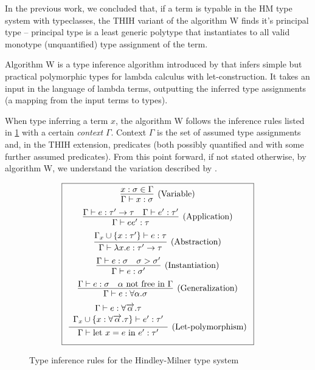 In the previous work, we concluded that, if a term is typable in the HM type system with typeclasses, the THIH variant of the algorithm W finds it's principal type -- principal type is a least generic polytype that instantiates to all valid monotype (unquantified) type assignment of the term.

Algorithm W is a type inference algorithm introduced by \citet{damas1982principal} that infers simple but practical polymorphic types for lambda calculus with let-construction. It takes an input in the language of lambda terms, outputting the inferred type assignments (a mapping from the input terms to types).

When type inferring a term $x$, the algorithm W follows the inference rules listed in \cref{fig:wRules} with a certain \emph{context} $\Gamma$. Context $\Gamma$ is the set of assumed type assignments and, in the THIH extension, predicates (both possibly quantified and with some further assumed predicates). From this point forward, if not stated otherwise, by algorithm W, we understand the variation described by \citet{jones1999typing}.

\begin{figure}
    \caption{Type inference rules for the Hindley-Milner type system}
    \label{fig:wRules}
    $$\boxed{\renewcommand{\arraystretch}{2.2}\begin{array}{cc}
        \infer[\text{(Variable)}]{\Gamma \vdash x : \sigma}{x : \sigma \in \Gamma} \\
        \infer[\text{(Application)}]{\Gamma \vdash e e' : \tau}{\Gamma \vdash e : \tau' \rightarrow \tau & \Gamma \vdash e' : \tau'} \\
        \infer[\text{(Abstraction)}]{\Gamma \vdash \lambda x . e : \tau' \rightarrow \tau}{\Gamma_x \cup \{x : \tau'\} \vdash e : \tau} \\
        \infer[\text{(Instantiation)}]{\Gamma \vdash e : \sigma'}{\Gamma \vdash e : \sigma & \sigma > \sigma'}\\
        \infer[\text{(Generalization)}]{\Gamma \vdash e : \forall \alpha . \sigma}{\Gamma \vdash e : \sigma & \alpha \text{ not free in }\Gamma}\\
        \infer[\text{(Let-polymorphism)}]{\Gamma \vdash \text{let } x = e \text{ in } e' : \tau'}{\renewcommand{\arraystretch}{1.1}\begin{array}{c}\Gamma \vdash e : \forall \vect{\alpha} . \tau \\ \Gamma_x \cup \{x :\forall \vect{\alpha} . \tau \} \vdash e' : \tau'\end{array}}
    \end{array}}$$
\end{figure}

